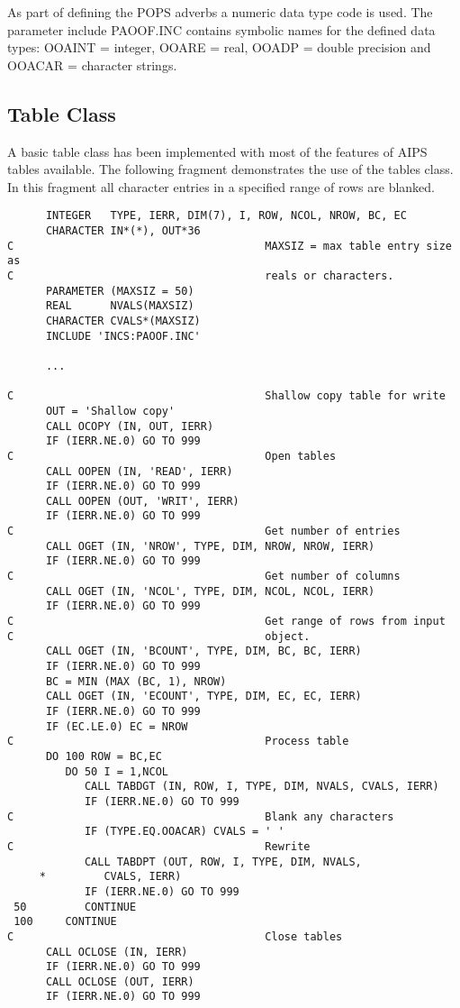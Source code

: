    As part of defining the POPS adverbs a numeric data type code is
used.  The parameter include PAOOF.INC contains symbolic names for the
defined data types: OOAINT = integer, OOARE = real, OOADP = double
precision and OOACAR = character strings.

\subsection{Table Class}
   A basic table class has been implemented with most of the features
of AIPS tables available.  The following fragment demonstrates the use
of the tables class.  In this fragment all character entries in a
specified range of rows are blanked.

{\small\begin{verbatim}
      INTEGER   TYPE, IERR, DIM(7), I, ROW, NCOL, NROW, BC, EC
      CHARACTER IN*(*), OUT*36
C                                       MAXSIZ = max table entry size as
C                                       reals or characters.
      PARAMETER (MAXSIZ = 50)
      REAL      NVALS(MAXSIZ)
      CHARACTER CVALS*(MAXSIZ)
      INCLUDE 'INCS:PAOOF.INC'

      ...

C                                       Shallow copy table for write
      OUT = 'Shallow copy'
      CALL OCOPY (IN, OUT, IERR)
      IF (IERR.NE.0) GO TO 999
C                                       Open tables
      CALL OOPEN (IN, 'READ', IERR)
      IF (IERR.NE.0) GO TO 999
      CALL OOPEN (OUT, 'WRIT', IERR)
      IF (IERR.NE.0) GO TO 999
C                                       Get number of entries
      CALL OGET (IN, 'NROW', TYPE, DIM, NROW, NROW, IERR)
      IF (IERR.NE.0) GO TO 999
C                                       Get number of columns
      CALL OGET (IN, 'NCOL', TYPE, DIM, NCOL, NCOL, IERR)
      IF (IERR.NE.0) GO TO 999
C                                       Get range of rows from input
C                                       object.
      CALL OGET (IN, 'BCOUNT', TYPE, DIM, BC, BC, IERR)
      IF (IERR.NE.0) GO TO 999
      BC = MIN (MAX (BC, 1), NROW)
      CALL OGET (IN, 'ECOUNT', TYPE, DIM, EC, EC, IERR)
      IF (IERR.NE.0) GO TO 999
      IF (EC.LE.0) EC = NROW
C                                       Process table
      DO 100 ROW = BC,EC
         DO 50 I = 1,NCOL
            CALL TABDGT (IN, ROW, I, TYPE, DIM, NVALS, CVALS, IERR)
            IF (IERR.NE.0) GO TO 999
C                                       Blank any characters
            IF (TYPE.EQ.OOACAR) CVALS = ' '
C                                       Rewrite
            CALL TABDPT (OUT, ROW, I, TYPE, DIM, NVALS,
     *         CVALS, IERR)
            IF (IERR.NE.0) GO TO 999
 50         CONTINUE
 100     CONTINUE
C                                       Close tables
      CALL OCLOSE (IN, IERR)
      IF (IERR.NE.0) GO TO 999
      CALL OCLOSE (OUT, IERR)
      IF (IERR.NE.0) GO TO 999
\end{verbatim}}
